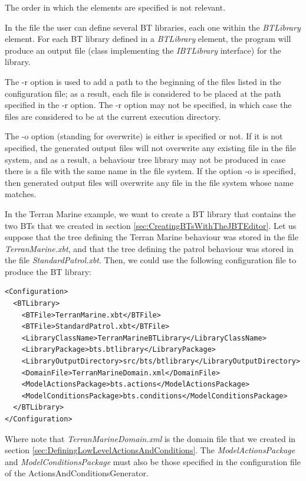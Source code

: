 \documentclass[a4paper]{article}
\begin{document}
The order in which the elements are specified is not relevant.

In the file the user can define several BT libraries, each one within the \textit{BTLibrary} element. For each BT library defined in a \textit{BTLibrary} element, the program will produce an output file (class implementing the \textit{IBTLibrary} interface) for the library.

The -r option is used to add a path to the beginning of the files listed in the configuration file; as a result, each file is considered to be placed at the path specified in the -r option. The -r option may not be specified, in which case the files are considered to be at the current execution directory.

The -o option (standing for overwrite) is either is specified or not. If it is not specified, the generated output files will not overwrite any existing file in the file system, and as a result, a behaviour tree library may not be produced in case there is a file with the same name in the file system. If the option -o is specified, then generated output files will overwrite any file in the file system whose name matches.

In the Terran Marine example, we want to create a BT library that contains the two BTs that we created in section \ref{sec:CreatingBTsWithTheJBTEditor}. Let us suppose that the tree defining the Terran Marine behaviour was stored in the file \textit{TerranMarine.xbt}, and that the tree defining the patrol behaviour was stored in the file \textit{StandardPatrol.xbt}. Then, we could use the following configuration file to produce the BT library:

\begin{verbatim}
<Configuration>
  <BTLibrary>
    <BTFile>TerranMarine.xbt</BTFile>
    <BTFile>StandardPatrol.xbt</BTFile>
    <LibraryClassName>TerranMarineBTLibrary</LibraryClassName>
    <LibraryPackage>bts.btlibrary</LibraryPackage>
    <LibraryOutputDirectory>src/bts/btlibrary</LibraryOutputDirectory>
    <DomainFile>TerranMarineDomain.xml</DomainFile>
    <ModelActionsPackage>bts.actions</ModelActionsPackage>
    <ModelConditionsPackage>bts.conditions</ModelConditionsPackage>
  </BTLibrary>
</Configuration>
\end{verbatim}

Where note that \textit{TerranMarineDomain.xml} is the domain file that we created in section \ref{sec:DefiningLowLevelActionsAndConditions}. The \textit{ModelActionsPackage} and \textit{ModelConditionsPackage} must also be those specified in the configuration file of the ActionsAndConditionsGenerator.
\end{document}
